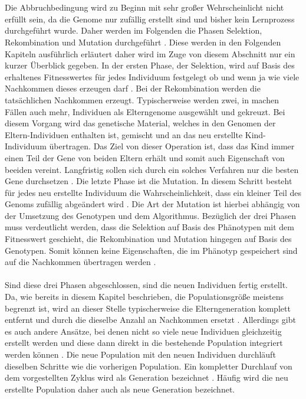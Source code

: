 \\\\
Die Abbruchbedingung wird zu Beginn mit sehr großer Wehrscheinlicht nicht erfüllt sein, da die Genome nur zufällig erstellt sind und bisher kein Lernprozess durchgeführt wurde. Daher werden im Folgenden die Phasen Selektion, Rekombination und Mutation durchgeführt \cite{rothlauf2006representation}. Diese werden in den Folgenden Kapiteln ausführlich erläutert daher wird im Zuge von diesem Abschnitt nur ein kurzer Überblick gegeben. In der ersten Phase, der Selektion, wird auf Basis des erhaltenes Fitnesswertes für jedes Individuum festgelegt ob und wenn ja wie viele Nachkommen dieses erzeugen darf \cite{weicker2015evolutionare}. Bei der Rekombination werden die tatsächlichen Nachkommen erzeugt. Typischerweise werden zwei, in machen Fällen auch mehr, Individuen als Elterngenome ausgewählt und gekreuzt. Bei diesem Vorgang wird das genetische Material, welches in den Genomen der Eltern-Individuen enthalten ist, gemischt und an das neu erstellte Kind-Individuum übertragen. Das Ziel von dieser Operation ist, dass das Kind immer einen Teil der Gene von beiden Eltern erhält und somit auch Eigenschaft von beeiden vereint. Langfristig sollen sich durch ein solches Verfahren nur die besten Gene durchsetzen \cite{weicker2015evolutionare}. 
Die letzte Phase ist die Mutation. In diesem Schritt besteht für jedes neu erstellte Individuum die Wahrscheinlichkeit, dass ein kleiner Teil des Genoms zufällig abgeändert wird \cite{rojas1996neural}. Die Art der Mutation ist hierbei abhängig von der Umsetzung des Genotypen und dem Algorithmus. Bezüglich der drei Phasen muss verdeutlicht werden, dass die Selektion auf Basis des Phänotypen mit dem Fitnesswert geschieht, die Rekombination und Mutation hingegen auf Basis des Genotypen. Somit können keine Eigenschaften, die im Phänotyp gespeichert sind auf die Nachkommen übertragen werden \cite{rothlauf2006representation}.
\\\\
Sind diese drei Phasen abgeschlossen, sind die neuen Individuen fertig erstellt. Da, wie bereits in diesem Kapitel beschrieben, die Populationsgröße meistens begrenzt ist, wird an dieser Stelle typischerweise die Elterngeneration komplett entfernt und durch die dieselbe Anzahl an Nachkommen ersetzt \cite{weicker2015evolutionare}. Allerdings gibt es auch andere Ansätze, bei denen nicht so viele neue Individuen gleichzeitig erstellt werden und diese dann direkt in die bestehende Population integriert werden können \cite{stanley2005real}. Die neue Population mit den neuen Individuen durchläuft dieselben Schritte wie die vorherigen Population. Ein kompletter Durchlauf von dem vorgestellten Zyklus wird als Generation bezeichnet \cite{weicker2015evolutionare}. Häufig wird die neu erstellte Population daher auch als neue Generation bezeichnet. 

